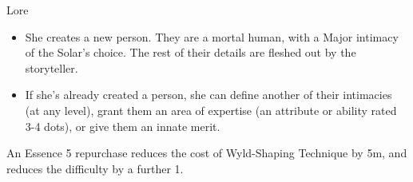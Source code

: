 \begin{Ability}{Lore}
  \begin{itemize}
    \item She creates a new person. They are a mortal human, with a Major intimacy of the Solar's choice. The rest of their details are fleshed out by the storyteller.
    \item If she's already created a person, she can define another of their intimacies (at any level), grant them an area of expertise (an attribute or ability rated 3-4 dots), or give them an innate merit.
  \end{itemize}

  An Essence 5 repurchase reduces the cost of Wyld-Shaping Technique by 5m, and reduces the difficulty by a further 1.

\end{Ability}

